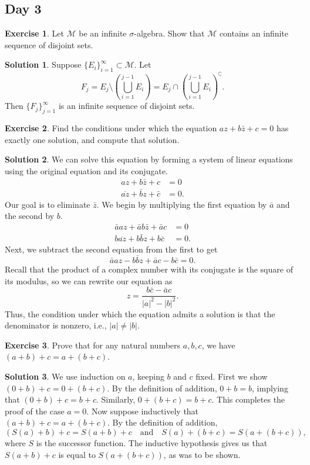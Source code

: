 \documentclass{article}
\theoremstyle{definition}
\newtheorem{exercise}{Exercise}
\newtheorem*{solution}{Solution}
\begin{document}
\subsection*{Day 3}
\begin{exercise}
    Let \(\mathcal{M}\) be an infinite \(\sigma\)-algebra. Show that \(\mathcal{M}\) contains an infinite sequence of disjoint sets.
\end{exercise}
\begin{solution}
    Suppose \(\{E_i\}_{i=1}^\infty\subset\mathcal{M}\). Let
    \[F_j =E_j\setminus \left(\bigcup_{i=1}^{j-1} E_i\right) = E_j \cap \left(\bigcup_{i=1}^{j-1} E_i\right)^\complement.\]
    Then \(\{F_j\}_{j=1}^\infty\) is an infinite sequence of disjoint sets.
\end{solution}

\begin{exercise}
    Find the conditions under which the equation \(az+b\bar{z}+c=0\) has exactly one solution, and compute that solution.
\end{exercise}
\begin{solution}
    We can solve this equation by forming a system of linear equations using the original equation and its conjugate.
    \begin{align*}
        az+b\bar{z}+c&=0 \\
        \overline{az}+\bar{b}z+\bar{c}&=0.
    \end{align*}
    Our goal is to eliminate \(\bar{z}\). We begin by multiplying the first equation by \(\bar{a}\) and the second by \(b\).
    \begin{align*}
        \bar{a}az+\bar{a}b\bar{z}+\bar{a}c&=0 \\
        b\overline{az}+b\bar{b}z+b\bar{c}&=0.
    \end{align*}
    Next, we subtract the second equation from the first to get
    \[\bar{a}az-b\bar{b}z+\bar{a}c-b\bar{c}=0.\]
    Recall that the product of a complex number with its conjugate is the square of its modulus, so we can rewrite our equation as
    \[z=\frac{b\bar{c}-\bar{a}c}{|a|^2-|b|^2}.\]
    Thus, the condition under which the equation admits a solution is that the denominator is nonzero, i.e., \(|a|\neq|b|\).
\end{solution}

\begin{exercise}
    Prove that for any natural numbers \(a,b,c\), we have \((a+b)+c=a+(b+c)\).
\end{exercise}
\begin{solution}
    We use induction on \(a\), keeping \(b\) and \(c\) fixed. First we show \((0+b)+c=0+(b+c)\). By the definition of addition, \(0+b=b\), implying that \((0+b)+c=b+c\). Similarly, \(0+(b+c)=b+c\). This completes the proof of the case \(a=0\). Now suppose inductively that \((a+b)+c=a+(b+c)\). By the definition of addition, 
    \[(S(a)+b)+c=S(a+b)+c\quad\text{and}\quad S(a)+(b+c)=S(a+(b+c)),\]
    where \(S\) is the successor function. The inductive hypothesis gives us that \(S(a+b)+c\) is equal to \(S(a+(b+c))\), as was to be shown. 
\end{solution}
\end{document}
